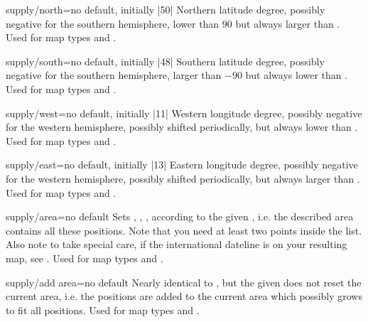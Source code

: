 \begin{docMrcKey}{supply/north}{=}{no default, initially |50|}
  Northern latitude degree, possibly negative for the southern hemisphere,
  lower than $90$ but always larger than .
  Used for map types  and .
\end{docMrcKey}

\begin{docMrcKey}{supply/south}{=}{no default, initially |48|}
  Southern latitude degree, possibly negative for the southern hemisphere,
  larger than $-90$ but always lower than .
  Used for map types  and .
\end{docMrcKey}

\begin{docMrcKey}{supply/west}{=}{no default, initially |11|}
  Western longitude degree, possibly negative for the western hemisphere,
  possibly shifted periodically, but always lower than .
  Used for map types  and .
\end{docMrcKey}

\begin{docMrcKey}{supply/east}{=}{no default, initially |13|}
  Eastern longitude degree, possibly negative for the western hemisphere,
  possibly shifted periodically, but always larger than .
  Used for map types  and .
\end{docMrcKey}


\begin{docMrcKey}{supply/area}{=}{no default}
  Sets
  , ,
  , 
  according to the given , i.e.
  the described area contains all these positions.
  Note that you need at least two points inside the list.
  Also note to take special care, if the international dateline is on your
  resulting map, see .
  Used for map types  and .
\end{docMrcKey}


\begin{docMrcKey}{supply/add area}{=}{no default}
  Nearly identical to , but
  the given 
  does not reset the current area, i.e. the positions are added to the
  current area which possibly grows to fit all positions.
  Used for map types  and .
\end{docMrcKey}


